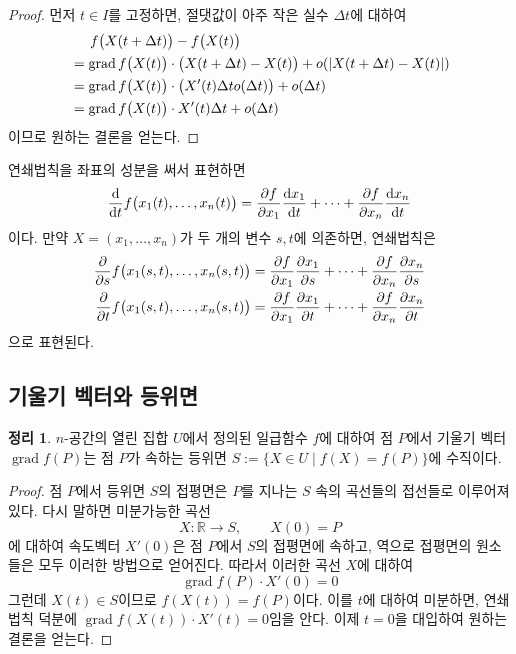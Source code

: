 \documentclass[unfonts,oneside,a4paper]{oblivoir}
\theoremstyle{definition}
\theoremstyle{theorem}
\newtheorem{theorem}{정리}[subsubsection]
\DeclareMathOperator{\grad}{grad}
\begin{document}
\begin{proof}
    먼저 $t \in I$를 고정하면, 절댓값이 아주 작은 실수 $\Delta t$에 대하여
    \begin{align*}
        &\hphantom{=\ \ } f\bigl(X(t + \Delta t)\bigr) - f\bigl(X(t)\bigr)\\
        &= \grad f\bigl(X(t)\bigr) \cdot \bigl(X(t + \Delta t) - X(t)\bigr) + o(|X(t + \Delta t) - X(t)|)\\
        &= \grad f\bigl(X(t)\bigr) \cdot \bigl(X'(t)\Delta t o(\Delta t)\bigr) + o(\Delta t)\\
        &= \grad f\bigl(X(t)\bigr) \cdot X'(t) \Delta t + o(\Delta t)
    \end{align*}
    이므로 원하는 결론을 얻는다.
\end{proof}

연쇄법칙을 좌표의 성분을 써서 표현하면
\begin{equation*}
    \diff*{f\bigl(x_1(t), \dots, x_n(t)\bigr)}{t} = \diffp{f}{x_1} \diff{x_1}{t} + \dots + \diffp{f}{x_n} \diff{x_n}{t}
\end{equation*}
이다. 만약 $X = (x_1, \dots, x_n)$가 두 개의 변수 $s, t$에 의존하면, 연쇄법칙은
\begin{align*}
    \diffp*{f\bigl(x_1(s, t), \dots, x_n(s, t)\bigr)}{s} &= \diffp{f}{x_1} \diffp{x_1}{s} + \dots + \diffp{f}{x_n} \diffp{x_n}{s}\\
    \diffp*{f\bigl(x_1(s, t), \dots, x_n(s, t)\bigr)}{t} &= \diffp{f}{x_1} \diffp{x_1}{t} + \dots + \diffp{f}{x_n} \diffp{x_n}{t}
\end{align*}
으로 표현된다.

\subsection{기울기 벡터와 등위면}

\begin{theorem}
    $n$-공간의 열린 집합 $U$에서 정의된 일급함수 $f$에 대하여 점 $P$에서 기울기 벡터 $\grad f(P)$는 점 $P$가 속하는 등위면 $S := \{X \in U \mid f(X) = f(P)\}$에 수직이다.
\end{theorem}

\begin{proof}
    점 $P$에서 등위면 $S$의 접평면은 $P$를 지나는 $S$ 속의 곡선들의 접선들로 이루어져 있다.
    다시 말하면 미분가능한 곡선
    \begin{equation*}
        X: \mathbb R \rightarrow S, \qquad X(0) = P
    \end{equation*}
    에 대하여 속도벡터 $X'(0)$은 점 $P$에서 $S$의 접평면에 속하고, 역으로 접평면의 원소들은 모두 이러한 방법으로 얻어진다.
    따라서 이러한 곡선 $X$에 대하여
    \begin{equation*}
        \grad f(P) \cdot X'(0) = 0
    \end{equation*}
    그런데 $X(t) \in S$이므로 $f(X(t)) = f(P)$이다.
    이를 $t$에 대하여 미분하면, 연쇄법칙 덕분에 $\grad f(X(t)) \cdot X'(t) = 0$임을 안다.
    이제 $t = 0$을 대입하여 원하는 결론을 얻는다.
\end{proof}
\end{document}
